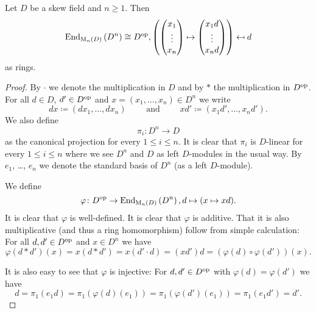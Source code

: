 \begin{lem}
  Let $D$ be a skew field and $n \geq 1$. Then
  \[
    \operatorname{End}_{\operatorname{M}_n(D)}\left(D^n\right) \cong D^{\mathrm{op}},
    \left( \begin{pmatrix}x_1 \\ \vdots \\ x_n\end{pmatrix} \mapsto \begin{pmatrix}x_1 d \\ \vdots \\ x_n d\end{pmatrix} \right) \mapsfrom d
  \]
  as rings.
\end{lem}
\begin{proof}
  By $\cdot$ we denote the multiplication in $D$ and by $*$ the multiplication in $D^{\mathrm{op}}$. For all $d \in D$, $d' \in D^{\mathrm{op}}$ and $x = (x_1, \dotsc, x_n) \in D^n$ we write
  \[
    d x \coloneqq (d x_1, \dotsc, d x_n)
    \qquad \text{ and } \qquad
    x d' \coloneqq (x_1 d', \dotsc, x_n d'). 
  \]
  We also define
  \[
    \pi_i \colon D^n \to D
  \]
  as the canonical projection for every $1 \leq i \leq n$. It is clear that $\pi_i$ is $D$-linear for every $1 \leq i \leq n$ where we see $D^n$ and $D$ as left $D$-modules in the usual way. By $e_1$, \dots, $e_n$ we denote the standard basis of $D^n$ (as a left $D$-module).
  
  We define
  \[
    \varphi \colon D^{\mathrm{op}} \to \operatorname{End}_{\operatorname{M}_n(D)}\left( D^n \right), d \mapsto (x \mapsto x d).
  \]
  It is clear that $\varphi$ is well-defined. It is clear that $\varphi$ is additive. That it is also multiplicative (and thus a ring homomorphism) follow from simple calculation: For all $d,d' \in D^{\mathrm{op}}$ and $x \in D^n$ we have
  \[
    \varphi(d * d')(x)
    = x (d * d')
    = x (d' \cdot d)
    = (x d') d
    = \left( \varphi(d) \circ \varphi(d') \right)(x).
  \]
  
  It is also easy to see that $\varphi$ is injective: For $d, d' \in D^{\mathrm{op}}$ with $\varphi(d) = \varphi(d')$ we have
  \[
    d = \pi_1(e_1 d) = \pi_1(\varphi(d)(e_1)) = \pi_1(\varphi(d')(e_1)) = \pi_1(e_1 d') = d'.
  \]
  

\end{proof}
